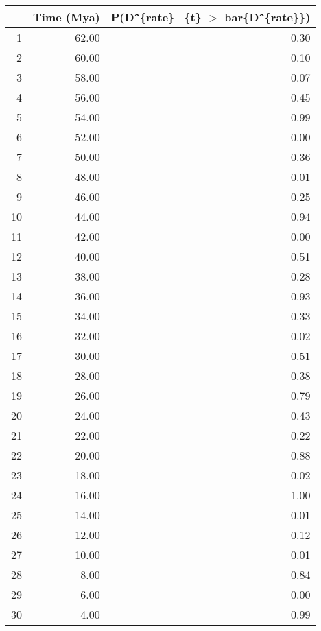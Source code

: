 \begin{table}[ht]
\centering
\begin{tabular}{rrr}
  \hline
 & Time (Mya) & P(D\verb|^|\{rate\}\_\{t\} $>$ bar\{D\verb|^|\{rate\}\}) \\ 
  \hline
1 & 62.00 & 0.30 \\ 
  2 & 60.00 & 0.10 \\ 
  3 & 58.00 & 0.07 \\ 
  4 & 56.00 & 0.45 \\ 
  5 & 54.00 & 0.99 \\ 
  6 & 52.00 & 0.00 \\ 
  7 & 50.00 & 0.36 \\ 
  8 & 48.00 & 0.01 \\ 
  9 & 46.00 & 0.25 \\ 
  10 & 44.00 & 0.94 \\ 
  11 & 42.00 & 0.00 \\ 
  12 & 40.00 & 0.51 \\ 
  13 & 38.00 & 0.28 \\ 
  14 & 36.00 & 0.93 \\ 
  15 & 34.00 & 0.33 \\ 
  16 & 32.00 & 0.02 \\ 
  17 & 30.00 & 0.51 \\ 
  18 & 28.00 & 0.38 \\ 
  19 & 26.00 & 0.79 \\ 
  20 & 24.00 & 0.43 \\ 
  21 & 22.00 & 0.22 \\ 
  22 & 20.00 & 0.88 \\ 
  23 & 18.00 & 0.02 \\ 
  24 & 16.00 & 1.00 \\ 
  25 & 14.00 & 0.01 \\ 
  26 & 12.00 & 0.12 \\ 
  27 & 10.00 & 0.01 \\ 
  28 & 8.00 & 0.84 \\ 
  29 & 6.00 & 0.00 \\ 
  30 & 4.00 & 0.99 \\ 
   \hline
\end{tabular}
\label{tab:rate_peak}
\end{table}
